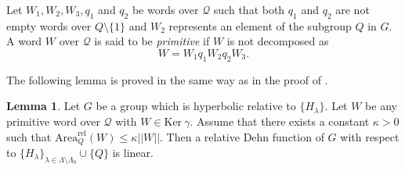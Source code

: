 \documentclass{amsart}
\theoremstyle{definition}
\newtheorem{Lem}[Thm]{Lemma}
\begin{document}
Let $W_1, W_2, W_3, q_1$ and $q_2$ be words over ${\mathcal Q}$ such that both $q_1$ and $q_2$ are not empty words over $Q\setminus \{1\}$ and $W_2$ represents an element of the subgroup $Q$ in $G$. 
A word $W$ over $\mathcal Q$ is said to be \textit{primitive} if $W$ is not decomposed as 
$$
W= W_1q_1W_2q_2W_3.
$$

The following lemma is proved in the same way as in the proof of \cite[Lemma 3.5]{Osi06a}. 

\begin{Lem}\label{Osi_lem3.5}
Let $G$ be a group which is hyperbolic relative to $\{H_\lambda\}$. 
Let $W$ be any primitive word over $\mathcal Q$ with $W \in \mathrm{Ker}\ \gamma$.
Assume that there exists a constant $\kappa >0$ such that ${\mathrm{Area}_Q^{\mathrm{rel}}}(W)\leq \kappa || W ||$. 
Then a relative Dehn function of $G$ with respect to $\{H_\lambda\}_{\lambda \in \Lambda\setminus\Lambda_0}\cup \{Q\}$ is linear. 
\end{Lem}
\end{document}
